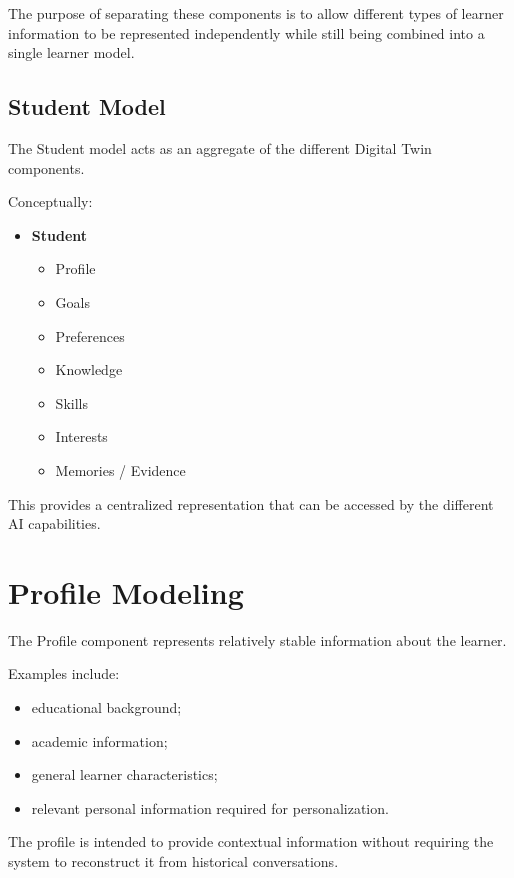 \documentclass[12pt,a4paper]{article}
\begin{document}
The purpose of separating these components is to allow different types of learner information to be represented independently while still being combined into a single learner model.

\subsection{Student Model}
The Student model acts as an aggregate of the different Digital Twin components.

Conceptually:

\begin{itemize}[noitemsep,topsep=2pt]
    \item[] \textbf{Student}
    \begin{itemize}[noitemsep,topsep=1pt]
        \item[$\vdash$] Profile
        \item[$\vdash$] Goals
        \item[$\vdash$] Preferences
        \item[$\vdash$] Knowledge
        \item[$\vdash$] Skills
        \item[$\vdash$] Interests
        \item[$\llcorner$] Memories / Evidence
    \end{itemize}
\end{itemize}

This provides a centralized representation that can be accessed by the different AI capabilities.

\section{Profile Modeling}
The Profile component represents relatively stable information about the learner.

Examples include:
\begin{itemize}[noitemsep,topsep=2pt]
    \item educational background;
    \item academic information;
    \item general learner characteristics;
    \item relevant personal information required for personalization.
\end{itemize}

The profile is intended to provide contextual information without requiring the system to reconstruct it from historical conversations.
\end{document}
